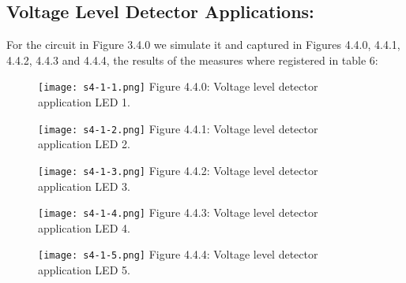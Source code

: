 \subsection{Voltage Level Detector Applications:}

For the circuit in Figure 3.4.0 we simulate it and captured in Figures 4.4.0, 4.4.1, 4.4.2, 4.4.3 and 4.4.4, the results of the measures where registered in table 6:

\begin{figure}[H]
\texttt{[image: s4-1-1.png]}
\centering \linebreak \linebreak Figure 4.4.0: Voltage level detector application LED 1.
\end{figure} \hfill

\begin{figure}[H]
\texttt{[image: s4-1-2.png]}
\centering \linebreak \linebreak Figure 4.4.1: Voltage level detector application LED 2.
\end{figure} \hfill

\begin{figure}[H]
\texttt{[image: s4-1-3.png]}
\centering \linebreak \linebreak Figure 4.4.2: Voltage level detector application LED 3.
\end{figure} \hfill

\begin{figure}[H]
\texttt{[image: s4-1-4.png]}
\centering \linebreak \linebreak Figure 4.4.3: Voltage level detector application LED 4.
\end{figure} \hfill

\begin{figure}[H]
\texttt{[image: s4-1-5.png]}
\centering \linebreak \linebreak Figure 4.4.4: Voltage level detector application LED 5.
\end{figure} \hfill

